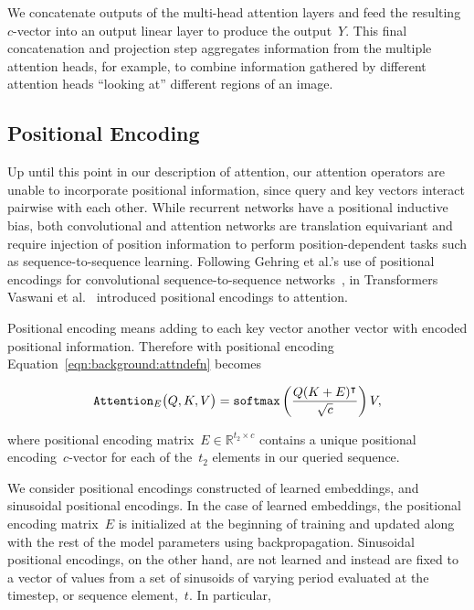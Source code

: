 We concatenate outputs of the multi-head attention layers and feed the
resulting~$c$-vector into an output linear layer to produce the output~$Y$.
This final concatenation and projection step aggregates information from the
multiple attention heads, for example, to combine information gathered by
different attention heads ``looking at'' different regions of an image.


\subsection{Positional Encoding}

Up until this point in our description of attention, our attention operators
are unable to incorporate positional information, since query and key vectors
interact pairwise with each other.
While recurrent networks have a positional inductive bias, both convolutional
and attention networks are translation equivariant and require injection of
position information to perform position-dependent tasks such as
sequence-to-sequence learning.
Following Gehring et al.'s use of positional encodings for convolutional
sequence-to-sequence networks~\cite{gehring2017convolutional}, in Transformers
Vaswani et al.~\cite{vaswani2017attention} introduced positional encodings to
attention.

Positional encoding means adding to each key vector another vector with encoded
positional information.
Therefore with positional encoding Equation~\ref{eqn:background:attndefn} becomes

\begin{equation}
\mathtt{Attention}_E\big(Q, K, V\big) = \mathtt{softmax}{}\left(\frac{Q(K + E)^\intercal}{\sqrt{c}}\right) V,
\label{eqn:background:posenc-attn}
\end{equation}

\noindent where positional encoding matrix~$E \in \mathbb{R}^{t_2\times c}$ contains a
unique positional encoding~$c$-vector for each of the~$t_2$ elements in our
queried sequence.

We consider positional encodings constructed of learned embeddings, and sinusoidal
positional encodings.
In the case of learned embeddings, the positional encoding matrix~$E$ is
initialized at the beginning of training and updated along with the rest of the
model parameters using backpropagation.
Sinusoidal positional encodings, on the other hand, are not learned and instead
are fixed to a vector of values from a set of sinusoids of varying period
evaluated at the timestep, or sequence element,~$t$.
In particular,

